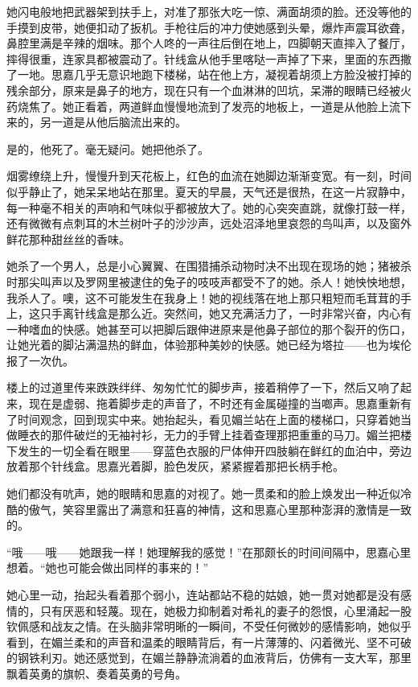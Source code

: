 \par 她闪电般地把武器架到扶手上，对准了那张大吃一惊、满面胡须的脸。还没等他的手摸到皮带，她便扣动了扳机。手枪往后的冲力使她感到头晕，爆炸声震耳欲聋，鼻腔里满是辛辣的烟味。那个人咚的一声往后倒在地上，四脚朝天直摔入了餐厅，摔得很重，连家具都被震动了。针线盒从他手里喀哒一声掉了下来，里面的东西撒了一地。思嘉几乎无意识地跑下楼梯，站在他上方，凝视着胡须上方脸没被打掉的残余部分，原来是鼻子的地方，现在只有一个血淋淋的凹坑，呆滞的眼睛已经被火药烧焦了。她正看着，两道鲜血慢慢地流到了发亮的地板上，一道是从他脸上流下来的，另一道是从他后脑流出来的。
\par 是的，他死了。毫无疑问。她把他杀了。
\par 烟雾缭绕上升，慢慢升到天花板上，红色的血流在她脚边渐渐变宽。有一刻，时间似乎静止了，她呆呆地站在那里。夏天的早晨，天气还是很热，在这一片寂静中，每一种毫不相关的声响和气味似乎都被放大了。她的心突突直跳，就像打鼓一样，还有微微有点刺耳的木兰树叶子的沙沙声，远处沼泽地里哀怨的鸟叫声，以及窗外鲜花那种甜丝丝的香味。
\par 她杀了一个男人，总是小心翼翼、在围猎捕杀动物时决不出现在现场的她；猪被杀时那尖叫声以及罗网里被逮住的兔子的吱吱声都受不了的她。杀人！她怏怏地想，我杀人了。噢，这不可能发生在我身上！她的视线落在地上那只粗短而毛茸茸的手上，这只手离针线盒是那么近。突然间，她又充满活力了，一时非常兴奋，内心有一种嗜血的快感。她甚至可以把脚后跟伸进原来是他鼻子部位的那个裂开的伤口，让她光着的脚沾满温热的鲜血，体验那种美妙的快感。她已经为塔拉——也为埃伦报了一次仇。
\par 楼上的过道里传来跌跌绊绊、匆匆忙忙的脚步声，接着稍停了一下，然后又响了起来，现在是虚弱、拖着脚步走的声音了，不时还有金属碰撞的当啷声。思嘉重新有了时间观念，回到现实中来。她抬起头，看见媚兰站在上面的楼梯口，只穿着她当做睡衣的那件破烂的无袖衬衫，无力的手臂上挂着查理那把重重的马刀。媚兰把楼下发生的一切全看在眼里——穿蓝色衣服的尸体伸开四肢躺在鲜红的血泊中，旁边放着那个针线盒。思嘉光着脚，脸色发灰，紧紧握着那把长柄手枪。
\par 她们都没有吭声，她的眼睛和思嘉的对视了。她一贯柔和的脸上焕发出一种近似冷酷的傲气，笑容里露出了满意和狂喜的神情，这和思嘉心里那种澎湃的激情是一致的。
\par “哦——哦——她跟我一样！她理解我的感觉！”在那颇长的时间间隔中，思嘉心里想着。“她也可能会做出同样的事来的！”
\par 她心里一动，抬起头看着那个弱小，连站都站不稳的姑娘，她一贯对她都是没有感情的，只有厌恶和轻蔑。现在，她极力抑制着对希礼的妻子的怨恨，心里涌起一股钦佩感和战友之情。在头脑非常明晰的一瞬间，不受任何微妙的感情影响，她似乎看到，在媚兰柔和的声音和温柔的眼睛背后，有一片薄薄的、闪着微光、坚不可破的钢铁利刃。她还感觉到，在媚兰静静流淌着的血液背后，仿佛有一支大军，那里飘着英勇的旗帜、奏着英勇的号角。
